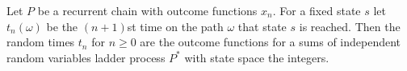 Let $P$ be a recurrent chain with outcome functions $x_n$. For a fixed state $s$ let $t_n(\omega)$ be the $(n+1)$st time on the path $\omega$ that state $s$ is reached. Then the random times $t_n$ for $n \geq 0$ are the outcome functions for a sums of independent random variables ladder process $P^*$ with state space the integers.
